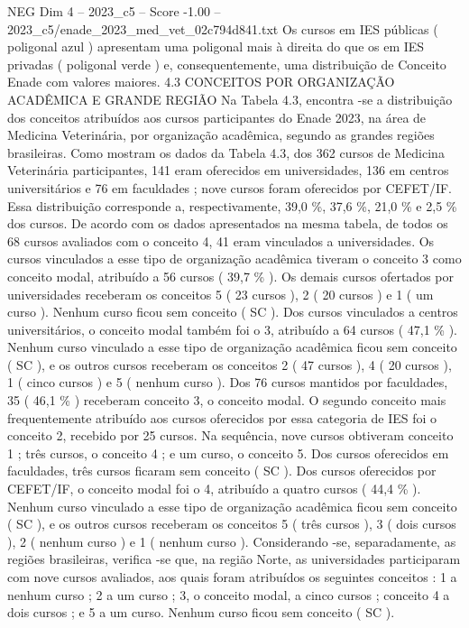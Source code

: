 \begin{textsample}{NEG Dim 4 – 2023\_c5 – Score -1.00 – 2023\_c5/enade\_2023\_med\_vet\_02c794d841.txt}
Os cursos em IES públicas ( poligonal azul ) apresentam uma poligonal mais à direita do que os em IES privadas ( poligonal verde ) e, consequentemente, uma distribuição de Conceito Enade com valores maiores. 4.3 CONCEITOS POR ORGANIZAÇÃO ACADÊMICA E GRANDE REGIÃO Na Tabela 4.3, encontra -se a distribuição dos conceitos atribuídos aos cursos participantes do Enade 2023, na área de Medicina Veterinária, por organização acadêmica, segundo as grandes regiões brasileiras.
Como mostram os dados da Tabela 4.3, dos 362 cursos de Medicina Veterinária participantes, 141 eram oferecidos em universidades, 136 em centros universitários e 76 em faculdades ; nove cursos foram oferecidos por CEFET/IF.
Essa distribuição corresponde a, respectivamente, 39,0 \%, 37,6 \%, 21,0 \% e 2,5 \% dos cursos.
De acordo com os dados apresentados na mesma tabela, de todos os 68 cursos avaliados com o conceito 4, 41 eram vinculados a universidades.
Os cursos vinculados a esse tipo de organização acadêmica tiveram o conceito 3 como conceito modal, atribuído a 56 cursos ( 39,7 \% ).
Os demais cursos ofertados por universidades receberam os conceitos 5 ( 23 cursos ), 2 ( 20 cursos ) e 1 ( um curso ).
Nenhum curso ficou sem conceito ( SC ).
Dos cursos vinculados a centros universitários, o conceito modal também foi o 3, atribuído a 64 cursos ( 47,1 \% ).
Nenhum curso vinculado a esse tipo de organização acadêmica ficou sem conceito ( SC ), e os outros cursos receberam os conceitos 2 ( 47 cursos ), 4 ( 20 cursos ), 1 ( cinco cursos ) e 5 ( nenhum curso ).
Dos 76 cursos mantidos por faculdades, 35 ( 46,1 \% ) receberam conceito 3, o conceito modal.
O segundo conceito mais frequentemente atribuído aos cursos oferecidos por essa categoria de IES foi o conceito 2, recebido por 25 cursos.
Na sequência, nove cursos obtiveram conceito 1 ; três cursos, o conceito 4 ; e um curso, o conceito 5.
Dos cursos oferecidos em faculdades, três cursos ficaram sem conceito ( SC ).
Dos cursos oferecidos por CEFET/IF, o conceito modal foi o 4, atribuído a quatro cursos ( 44,4 \% ).
Nenhum curso vinculado a esse tipo de organização acadêmica ficou sem conceito ( SC ), e os outros cursos receberam os conceitos 5 ( três cursos ), 3 ( dois cursos ), 2 ( nenhum curso ) e 1 ( nenhum curso ).
Considerando -se, separadamente, as regiões brasileiras, verifica -se que, na região Norte, as universidades participaram com nove cursos avaliados, aos quais foram atribuídos os seguintes conceitos : 1 a nenhum curso ; 2 a um curso ; 3, o conceito modal, a cinco cursos ; conceito 4 a dois cursos ; e 5 a um curso.
Nenhum curso ficou sem conceito ( SC ).

\end{textsample}
